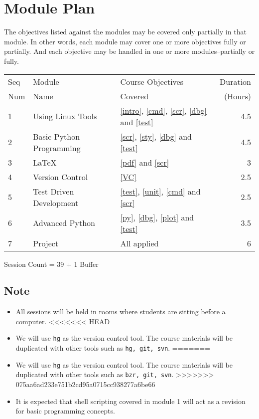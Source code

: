 \documentclass{article}
\begin{document}
\section{Module Plan}
The objectives listed against the modules may be covered only partially in that module. In other words, each module may cover one or more objectives fully or partially. And each objective may be handled in one or more modules--partially or fully. 

\begin{tabular}{||l|l|l|r||}\hline\hline
Seq & Module  & Course Objectives & Duration\\
Num & Name    & Covered           & (Hours)\\\hline 
1 & Using Linux Tools        & \ref{intro}, \ref{cmd}, \ref{scr}, \ref{dbg} and  \ref{test} & 4.5\\\hline
2 & Basic Python Programming & \ref{scr}, \ref{sty}, \ref{dbg} and \ref{test}               & 4.5\\\hline 
3 & LaTeX                    & \ref{pdf} and \ref{scr}                                      & 3\\\hline
4 & Version Control          & \ref{VC}                                                     & 2.5\\\hline
5 & Test Driven Development  & \ref{test}, \ref{unit}, \ref{cmd} and \ref{scr}              & 2.5\\\hline
6 & Advanced Python          & \ref{py}, \ref{dbg}, \ref{plot} and \ref{test}               & 3.5\\\hline
7 & Project                  & All applied                                                  & 6\\\hline
\end{tabular}    

Session Count = 39 + 1 Buffer
\subsection*{Note}
\begin{itemize}
    \item All sessions will be held in rooms where students are sitting before a computer.
<<<<<<< HEAD
    \item We will use \texttt{hg} as the version control tool. The course materials will be duplicated with other tools
          such as \texttt{hg, git, svn}.
=======
    \item We will use \texttt{hg} as the version control tool. The course materials will be duplicated with other tools
          such as \texttt{bzr, git, svn}.
>>>>>>> 075aa6ad233e751b2cd95a0715cc938277a6be66
    \item It is expected that shell scripting covered in module 1 will act as a revision for basic programming
      concepts.
\end{itemize}     
\end{document}
